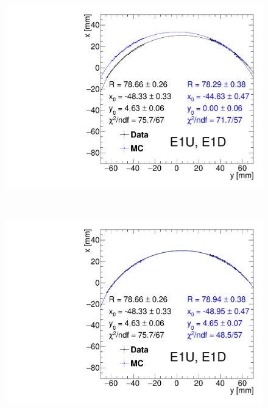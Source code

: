 \begin{figure}[ht!]\ContinuedFloat
\centering
\parbox{0.495\textwidth}{
  \centering
  \includegraphics[width=\linewidth,page=4]{graphics/rpSim/Apertures_swapedAxes_withFit_beforeDxShift.pdf}
}~
\parbox{0.495\textwidth}{
  \centering
  \includegraphics[width=\linewidth,page=4]{graphics/rpSim/Apertures_swapedAxes_withFit.pdf}
}%
\end{figure}
